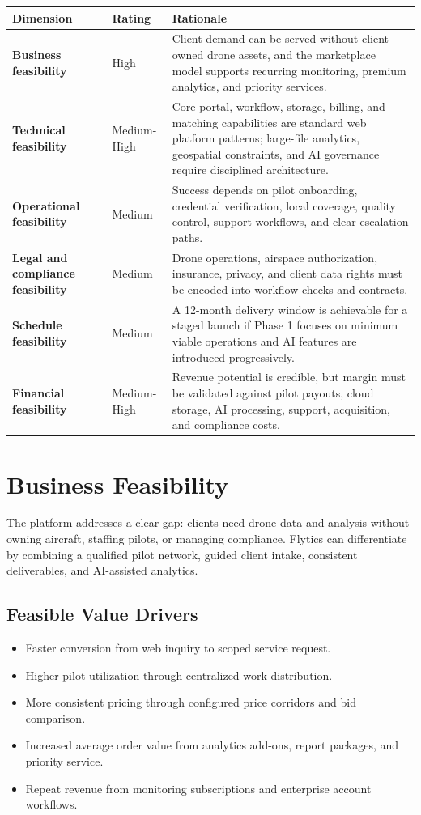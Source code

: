 \documentclass[11pt,a4paper]{article}
\begin{document}
\begin{longtable}{>{\bfseries}p{}p{}p{}}
\toprule
Dimension & Rating & Rationale \\
\midrule
Business feasibility & High & Client demand can be served without client-owned drone assets, and the marketplace model supports recurring monitoring, premium analytics, and priority services. \\
Technical feasibility & Medium-High & Core portal, workflow, storage, billing, and matching capabilities are standard web platform patterns; large-file analytics, geospatial constraints, and AI governance require disciplined architecture. \\
Operational feasibility & Medium & Success depends on pilot onboarding, credential verification, local coverage, quality control, support workflows, and clear escalation paths. \\
Legal and compliance feasibility & Medium & Drone operations, airspace authorization, insurance, privacy, and client data rights must be encoded into workflow checks and contracts. \\
Schedule feasibility & Medium & A 12-month delivery window is achievable for a staged launch if Phase 1 focuses on minimum viable operations and AI features are introduced progressively. \\
Financial feasibility & Medium-High & Revenue potential is credible, but margin must be validated against pilot payouts, cloud storage, AI processing, support, acquisition, and compliance costs. \\
\bottomrule
\end{longtable}

\section{Business Feasibility}

The platform addresses a clear gap: clients need drone data and analysis without owning aircraft, staffing pilots, or managing compliance. Flytics can differentiate by combining a qualified pilot network, guided client intake, consistent deliverables, and AI-assisted analytics.

\subsection*{Feasible Value Drivers}

\begin{itemize}[leftmargin=*]
    \item Faster conversion from web inquiry to scoped service request.
    \item Higher pilot utilization through centralized work distribution.
    \item More consistent pricing through configured price corridors and bid comparison.
    \item Increased average order value from analytics add-ons, report packages, and priority service.
    \item Repeat revenue from monitoring subscriptions and enterprise account workflows.
\end{itemize}
\end{document}
